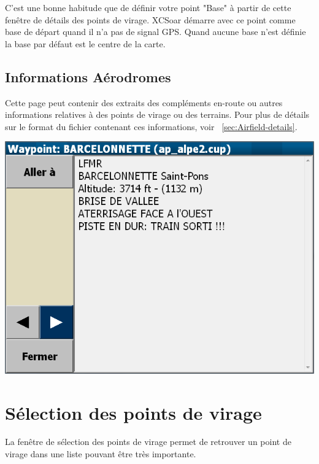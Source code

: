 C'est une bonne habitude que de définir votre point "Base" à partir de cette fenêtre de détails des points de virage. XCSoar démarre avec ce point comme  base de départ quand il n'a pas de signal GPS. Quand aucune base n'est définie la base par défaut est le centre de la carte.

\subsection*{Informations Aérodromes}
Cette page peut contenir des extraits des compléments en-route ou autres informations relatives à des points de virage ou des terrains. Pour plus de détails sur le format du fichier contenant ces informations, voir ~\ref{sec:Airfield-details}.

\begin{center}
\includegraphics[angle=0,width=0.8\linewidth,keepaspectratio='true']{figures/dialog-waypointdetails1.png}
\end{center}


\section{Sélection des points de virage}\label{sec:waypoint-selector-dialog}
La fenêtre de sélection des points de virage permet de retrouver un point de virage dans une liste pouvant être très importante. 

